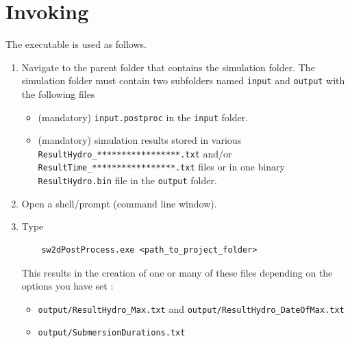 \section{Invoking \swPostProcess}
The \swPostProcess executable is used as follows.

\begin{enumerate}
	\item Navigate to the parent folder that contains the simulation folder. The simulation folder must contain two subfolders named \texttt{input} and \texttt{output} with the following files
	\begin{itemize}
		\item (mandatory) \texttt{input.postproc} in the \texttt{input} folder.
		\item (mandatory) simulation results stored in various \texttt{ResultHydro\_*****************.txt} and/or \texttt{ResultTime\_*****************.txt} files or in one binary \texttt{ResultHydro.bin} file in the \texttt{output} folder.
	\end{itemize}
	\item Open a shell/prompt (command line window).
	\item Type
	\begin{verbatim}
	sw2dPostProcess.exe <path_to_project_folder>
	\end{verbatim}
	This results in the creation of one or many of these files depending on the options you have set :
	\begin{itemize}
		\item \texttt{output/ResultHydro\_Max.txt} and \texttt{output/ResultHydro\_DateOfMax.txt}
		\item \texttt{output/SubmersionDurations.txt}
	\end{itemize}
\end{enumerate}
